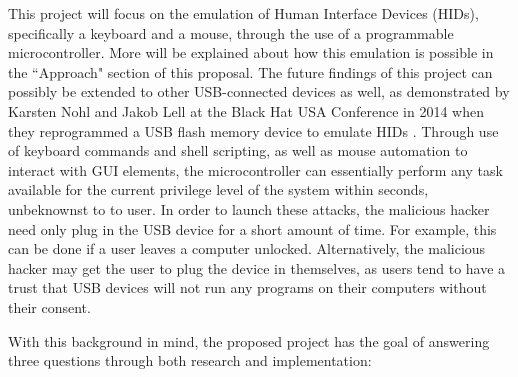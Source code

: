\documentclass{ieee}
\begin{document}
This project will focus on the emulation of Human Interface Devices (HIDs), specifically a keyboard and a mouse, through the use of a programmable microcontroller. More will be explained about how this emulation is possible in the ``Approach" section of this proposal. The future findings of this project can possibly be extended to other USB-connected devices as well, as demonstrated by Karsten Nohl and Jakob Lell at the Black Hat USA Conference in 2014 when they reprogrammed a USB flash memory device to emulate HIDs \cite{nohl}. Through use of keyboard commands and shell scripting, as well as mouse automation to interact with GUI elements, the microcontroller can essentially perform any task available for the current privilege level of the system within seconds, unbeknownst to to user. In order to launch these attacks, the malicious hacker need only plug in the USB device for a short amount of time. For example, this can be done if a user leaves a computer unlocked. Alternatively, the malicious hacker may get the user to plug the device in themselves, as users tend to have a trust that USB devices will not run any programs on their computers without their consent.

With this background in mind, the proposed project has the goal of answering three questions through both research and implementation:
\end{document}

